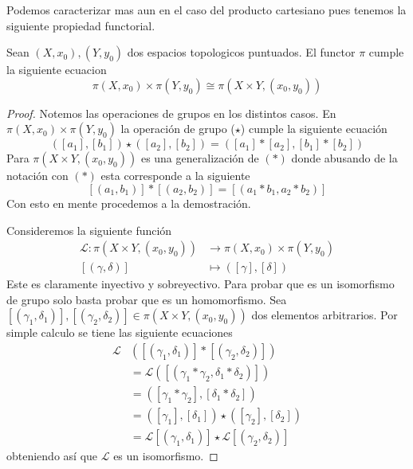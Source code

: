 Podemos caracterizar mas aun en el caso del producto cartesiano pues
tenemos la siguiente propiedad functorial.

\begin{teorema}
  Sean \((X, x_0), (Y,y_0)\) dos espacios topologicos puntuados. El
  functor \(\pi\) cumple la siguiente ecuacion
  \[ \pi (X, x_0) \times \pi (Y, y_0) \cong \pi (X \times Y, (x_0, y_0)) \]
\end{teorema}
\begin{proof}
  Notemos las operaciones de grupos en los distintos casos. En \(\pi(X,
  x_0) \times \pi (Y, y_0)\) la operación de grupo (\(\star\)) cumple la
  siguiente ecuación
  \[ ([a_1],[b_1]) \star ([a_2], [b_2]) = ([a_1] * [a_2] , [b_1] *
    [b_2]) \]
  Para \(\pi (X \times Y , (x_0, y_0))\) es una generalización de
  \((*)\) donde abusando de la notación con \((*)\) esta corresponde a
  la siguiente
  \[ [(a_1, b_1)] * [(a_2, b_2)] = [(a_1 * b_1 , a_2 * b_2)] \]
  Con esto en mente procedemos a la demostración.

  Consideremos la siguiente función
  \begin{align*}
    \mathcal L : \pi (X \times Y , (x_0, y_0)) &\longrightarrow \pi (X,
        x_0) \times \pi (Y, y_0) \\
    [(\gamma, \delta)] &\longmapsto ([\gamma], [\delta])
  \end{align*}
  Este es claramente inyectivo y sobreyectivo. Para probar que es un
  isomorfismo de grupo solo basta probar que es un homomorfismo. Sea
  \([(\gamma_1, \delta_1)], [(\gamma_2, \delta_2)] \in \pi (X \times Y ,
  (x_0, y_0))\) dos elementos arbitrarios. Por simple calculo se tiene
  las siguiente ecuaciones
  \begin{align*}
    \mathcal L &\left( [(\gamma_1, \delta_1)] * [(\gamma_2, \delta_2)] \right) \\
    &= \mathcal L \left( [(\gamma_1 * \gamma_2 , \delta_1 * \delta_2)] \right) \\
    &= ([\gamma_1 * \gamma_2] , [\delta_1 * \delta_2]) \\
    &= ([\gamma_1] , [\delta_1]) \star ([\gamma_2] , [\delta_2]) \\
    &= \mathcal L [(\gamma_1 , \delta_1)] \star \mathcal L [(\gamma_2 ,
      \delta_2)]
  \end{align*}
  obteniendo así que \(\mathcal L\) es un isomorfismo.
\end{proof}

